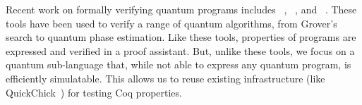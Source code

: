 


Recent work on formally verifying quantum programs includes \qwire~\cite{RandThesis}, \sqir~\cite{PQPC}, and \qbricks~\cite{qbricks}. These tools have been used to verify a range of quantum algorithms, from Grover's search to quantum phase estimation.
Like these tools, properties of \vqir programs are expressed and verified in a proof assistant.
But, unlike these tools, we focus on a quantum sub-language that, while not able to express any quantum program, is efficiently simulatable.
This allows us to reuse existing infrastructure (like QuickChick~\cite{quickchick}) for testing Coq properties.


